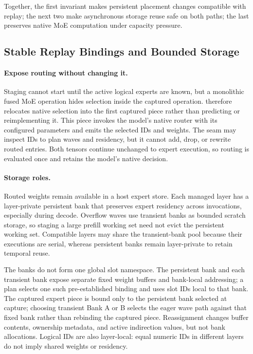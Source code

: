 Together, the first invariant makes persistent placement changes compatible
with replay; the next two make asynchronous storage reuse safe on both paths;
the last preserves native MoE computation under capacity pressure.

\subsection{Stable Replay Bindings and Bounded Storage}
\label{sec:design-interface}

\paragraph{Expose routing without changing it.}
Staging cannot start until the active logical experts are known, but a
monolithic fused MoE operation hides selection inside the captured operation.
\system therefore relocates native selection into the first captured piece
rather than predicting or reimplementing it. This piece invokes the model's
native router with its configured parameters and emits the selected IDs and
weights. The seam may inspect IDs to plan waves and residency, but it cannot
add, drop, or rewrite routed entries. Both tensors continue unchanged to expert
execution, so routing is evaluated once and retains the model's native
decision.

\paragraph{Storage roles.}
Routed weights remain available in a host expert store. Each managed layer has
a layer-private persistent bank that preserves expert residency across
invocations, especially during decode. Overflow waves use transient banks as
bounded scratch storage, so staging a large prefill working set need not evict
the persistent working set. Compatible layers may share the transient-bank
pool because their executions are serial, whereas persistent banks remain
layer-private to retain temporal reuse.

The banks do not form one global slot namespace. The persistent bank and each
transient bank expose separate fixed weight buffers and bank-local addressing;
a plan selects one such pre-established binding and uses slot IDs local to that
bank. The captured expert piece is bound only to the persistent bank selected
at capture; choosing transient Bank A or B selects the eager wave path against
that fixed bank rather than rebinding the captured piece. Reassignment changes
buffer contents, ownership metadata, and active indirection values, but not
bank allocations. Logical IDs are also layer-local: equal numeric IDs in
different layers do not imply shared weights or residency.

